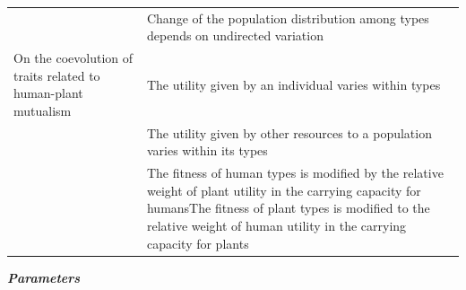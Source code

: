 \documentclass[
]{book}
\begin{document}
\begin{longtable}[]{@{}ll@{}}
\begin{minipage}[t]{0.45\columnwidth}
﻿\strut
\end{minipage} & \begin{minipage}[t]{0.49\columnwidth}\raggedright
Change of the population distribution among types depends on undirected variation\strut
\end{minipage}\tabularnewline
\begin{minipage}[t]{0.45\columnwidth}\raggedright
On the coevolution of traits related to human-plant mutualism\strut
\end{minipage} & \begin{minipage}[t]{0.49\columnwidth}\raggedright
The utility given by an individual varies within types\strut
\end{minipage}\tabularnewline
\begin{minipage}[t]{0.45\columnwidth}\raggedright
﻿\strut
\end{minipage} & \begin{minipage}[t]{0.49\columnwidth}\raggedright
The utility given by other resources to a population varies within its types\strut
\end{minipage}\tabularnewline
\begin{minipage}[t]{0.45\columnwidth}\raggedright
﻿\strut
\end{minipage} & \begin{minipage}[t]{0.49\columnwidth}\raggedright
The fitness of human types is modified by the relative weight of plant utility in the carrying capacity for humansThe fitness of plant types is modified to the relative weight of human utility in the carrying capacity for plants\strut
\end{minipage}\tabularnewline
\bottomrule
\end{longtable}

\newpage

\textbf{\emph{Parameters}}
\end{document}
